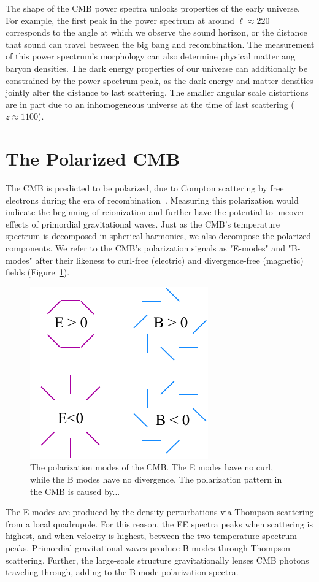 The shape of the CMB power spectra unlocks properties of the early universe.  For example, the first peak in the power spectrum at around $\ell\approx220$ corresponds to the angle at which we observe the sound horizon, or the distance that sound can travel between the big bang and recombination.  The measurement of this power spectrum's morphology can also determine physical matter ang baryon densities.  The dark energy properties of our universe can additionally be constrained by the power spectrum peak, as the dark energy and matter densities jointly alter the distance to last scattering.  The smaller angular scale distortions are in part due to an inhomogeneous universe at the time of last scattering ($z\approx 1100$). 

\section{The Polarized CMB}

The CMB is predicted to be polarized, due to Compton scattering by free electrons during the era of recombination~\cite{}.  Measuring this polarization would indicate the beginning of reionization and further have the potential to uncover effects of primordial gravitational waves.  Just as the CMB's temperature spectrum is decomposed in spherical harmonics, we also decompose the polarized components.  We refer to the CMB's polarization signals as "E-modes" and "B-modes" after their likeness to curl-free (electric) and divergence-free (magnetic) fields (Figure~\ref{fig:e_b_pol}).
\begin{figure}
    \centering
    \includegraphics[width = .45\textwidth]{Figures/EB_pol.pdf}
    \caption{The polarization modes of the CMB.  The E modes have no curl, while the B modes have no divergence.  The polarization pattern in the CMB is caused by...}
    \label{fig:e_b_pol}
\end{figure}

The E-modes are produced by the density perturbations via Thompson scattering from a local quadrupole.  For this reason, the EE spectra peaks when scattering is highest, and when velocity is highest, between the two temperature spectrum peaks.  Primordial gravitational waves produce B-modes through Thompson scattering.  Further, the large-scale structure gravitationally lenses CMB photons traveling through, adding to the B-mode polarization spectra.

